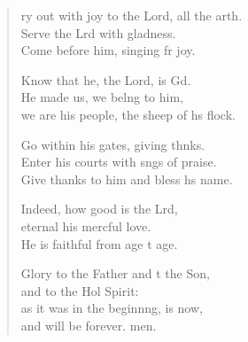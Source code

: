 \settowidth{\versewidth}{Cry out with joy to the Lord, all the earth. +}
\begin{verse}%
  \begin{patverse}
    ry out with joy to the Lord, all the arth.\Flex\\
Serve the Lrd with gladness.\Med\\
Come before him, singing fr joy.

Know that he, the Lord, is Gd.\Flex\\
He made us, we belng to him,\Med\\
we are his people, the sheep of h\pointup{\i}s flock.

Go within his gates, giving thnks.\Flex\\
Enter his courts with sngs of praise.\Med\\
Give thanks to him and bless h\pointup{\i}s name.

Indeed, how good is the Lrd,\Flex\\
eternal his merc\pointup{\i}ful love.\Med\\
He is faithful from age t age.

Glory to the Father and t the Son,\Med\\
and to the Hol Spirit:\\
as it was in the beginn\pointup{\i}ng, is now,\Med\\
and will be forever. men.
  \end{patverse}
\end{verse}
